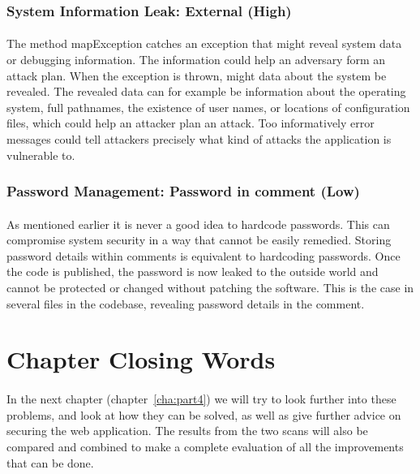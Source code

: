 \documentclass[11pt,english,a4paper]{report}
\begin{document}
\subsubsection{System Information Leak: External (High)}
\paragraph{}
The method mapException catches an exception that might reveal system data or debugging information. 
The information could help an adversary form an attack plan.
When the exception is thrown, might data about the system be revealed. 
The revealed data can for example be information about the operating system, full pathnames, the existence of user names, or locations of configuration files, which could help an attacker plan an attack.
Too informatively error messages could tell attackers precisely what kind of attacks the application is vulnerable to.

\subsubsection{Password Management: Password in comment (Low)}
\paragraph{}
As mentioned earlier it is never a good idea to hardcode passwords. 
This can compromise system security in a way that cannot be easily remedied.
Storing password details within comments is equivalent to hardcoding passwords.
Once the code is published, the password is now leaked to the outside world and cannot be protected or changed without patching the software. 
This is the case in several files in the codebase, revealing password details in the comment.


\section{Chapter Closing Words}
\paragraph{}
In the next chapter (chapter~\ref{cha:part4}) we will try to look further into these problems, and look at how they can be solved, as well as give further advice on securing the web application.
The results from the two scans will also be compared and combined to make a complete evaluation of all the improvements that can be done.
\end{document}
